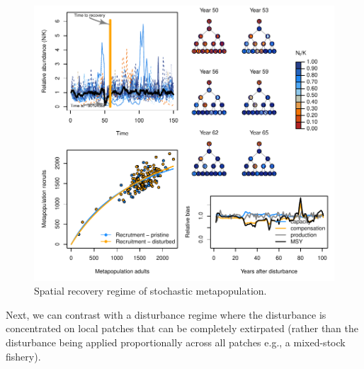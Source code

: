 \documentclass[]{article}
\begin{document}
\begin{figure}[H]

{\centering \includegraphics{Managing_for_ecological_surprises_in_metapopulations_makeHTML_files/figure-latex/example results3-1} 

}

\caption{Spatial recovery regime of stochastic metapopulation.}\label{fig:example results3}
\end{figure}

Next, we can contrast with a disturbance regime where the disturbance is
concentrated on local patches that can be completely extirpated (rather
than the disturbance being applied proportionally across all patches
e.g., a mixed-stock fishery).
\end{document}
